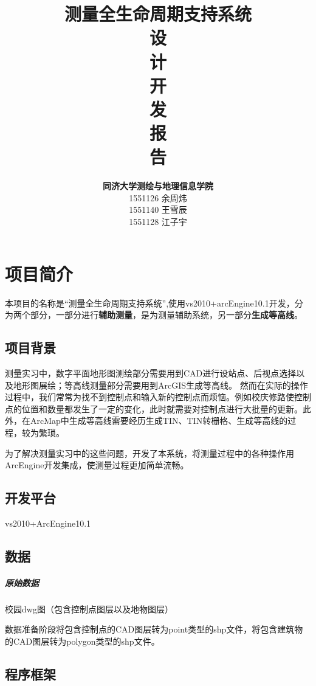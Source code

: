 \documentclass[twoside,color=blue,mathpazo,titlestyle=hang,12pt]{elegantbook}
\title{\Huge\textbf{测量全生命周期支持系统}\Huge\\设 \\ 计 \\ 开 \\ 发 \\ 报 \\ 告}
\author
{
\Large\textbf{同济大学测绘与地理信息学院} \\
1551126 余周炜 \\
1551140 王雪辰 \\
1551128 江子宇
}
\date{}
\numberwithin{equation}{section}
\begin{document}
\frontmatter

\maketitle


\tableofcontents

\mainmatter

\chapter{项目简介}

本项目的名称是“测量全生命周期支持系统”,使用vs2010+arcEngine10.1开发，分为两个部分，一部分进行\textbf{辅助测量}，是为测量辅助系统，另一部分\textbf{生成等高线}。

\section{项目背景}
测量实习中，数字平面地形图测绘部分需要用到CAD进行设站点、后视点选择以及地形图展绘；等高线测量部分需要用到ArcGIS生成等高线。 然而在实际的操作过程中，我们常常为找不到控制点和输入新的控制点而烦恼。例如校庆修路使控制点的位置和数量都发生了一定的变化，此时就需要对控制点进行大批量的更新。此外，在ArcMap中生成等高线需要经历生成TIN、TIN转栅格、生成等高线的过程，较为繁琐。

为了解决测量实习中的这些问题，开发了本系统，将测量过程中的各种操作用ArcEngine开发集成，使测量过程更加简单流畅。

\section{开发平台}

vs2010+ArcEngine10.1

\section{数据}

\paragraph{原始数据} 校园dwg图（包含控制点图层以及地物图层）

数据准备阶段将包含控制点的CAD图层转为point类型的shp文件，将包含建筑物的CAD图层转为polygon类型的shp文件。

\section{程序框架}
\end{document}

